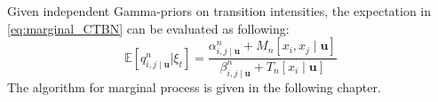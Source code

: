 Given independent Gamma-priors on transition intensities, the expectation in \autoref{eq:marginal_CTBN} can be evaluated as following:
\begin{equation}
	\mathbb{E}\left[q_{i,j\mid \textbf{u}}^{n} | \xi_{t}\right]=\frac{\alpha^n_{i,j\mid \textbf{u}}+M_{n}[x_i, x_j\mid \textbf{u}]}{\beta^n_{i,j\mid \textbf{u}}+T_{n}[x_i \mid \textbf{u}]}
\end{equation}
The algorithm for marginal process is given in the following chapter.
%
